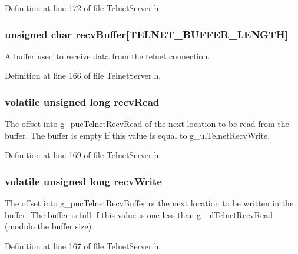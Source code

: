 Definition at line 172 of file Telnet\-Server.\-h.

\hypertarget{struct_telnet_server__t_a22aa9df37278d5baef90c6738214d9a1}{
\subsubsection[{recv\-Buffer}]{\setlength{\rightskip}{0pt plus 5cm}unsigned char recv\-Buffer\mbox{[}{\bf T\-E\-L\-N\-E\-T\-\_\-\-B\-U\-F\-F\-E\-R\-\_\-\-L\-E\-N\-G\-T\-H}\mbox{]}}}\label{struct_telnet_server__t_a22aa9df37278d5baef90c6738214d9a1}
A buffer used to receive data from the telnet connection. 

Definition at line 166 of file Telnet\-Server.\-h.

\hypertarget{struct_telnet_server__t_a4b9f32d419aaecd74a928bb8286f2a7b}{
\subsubsection[{recv\-Read}]{\setlength{\rightskip}{0pt plus 5cm}volatile unsigned long recv\-Read}}\label{struct_telnet_server__t_a4b9f32d419aaecd74a928bb8286f2a7b}
The offset into g\-\_\-puc\-Telnet\-Recv\-Read of the next location to be read from the buffer. The buffer is empty if this value is equal to g\-\_\-ul\-Telnet\-Recv\-Write. 

Definition at line 169 of file Telnet\-Server.\-h.

\hypertarget{struct_telnet_server__t_ac07efa3d17c62c9b958f4324b78ebf55}{
\subsubsection[{recv\-Write}]{\setlength{\rightskip}{0pt plus 5cm}volatile unsigned long recv\-Write}}\label{struct_telnet_server__t_ac07efa3d17c62c9b958f4324b78ebf55}
The offset into g\-\_\-puc\-Telnet\-Recv\-Buffer of the next location to be written in the buffer. The buffer is full if this value is one less than g\-\_\-ul\-Telnet\-Recv\-Read (modulo the buffer size). 

Definition at line 167 of file Telnet\-Server.\-h.

